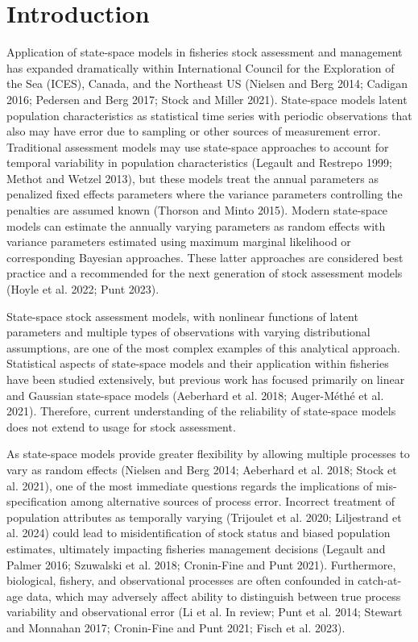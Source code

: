 \documentclass[
  12pt,
]{article}
\begin{document}
\pagebreak

\section*{Introduction}\label{introduction}

Application of state-space models in fisheries stock assessment and
management has expanded dramatically within International Council for
the Exploration of the Sea (ICES), Canada, and the Northeast US (Nielsen
and Berg 2014; Cadigan 2016; Pedersen and Berg 2017; Stock and Miller
2021). State-space models latent population characteristics as
statistical time series with periodic observations that also may have
error due to sampling or other sources of measurement error. Traditional
assessment models may use state-space approaches to account for temporal
variability in population characteristics (Legault and Restrepo 1999;
Methot and Wetzel 2013), but these models treat the annual parameters as
penalized fixed effects parameters where the variance parameters
controlling the penalties are assumed known (Thorson and Minto 2015).
Modern state-space models can estimate the annually varying parameters
as random effects with variance parameters estimated using maximum
marginal likelihood or corresponding Bayesian approaches. These latter
approaches are considered best practice and a recommended for the next
generation of stock assessment models (Hoyle et al. 2022; Punt 2023).

State-space stock assessment models, with nonlinear functions of latent
parameters and multiple types of observations with varying
distributional assumptions, are one of the most complex examples of this
analytical approach. Statistical aspects of state-space models and their
application within fisheries have been studied extensively, but previous
work has focused primarily on linear and Gaussian state-space models
(Aeberhard et al. 2018; {Auger-Méthé et al.} 2021). Therefore, current
understanding of the reliability of state-space models does not extend
to usage for stock assessment.

As state-space models provide greater flexibility by allowing multiple
processes to vary as random effects (Nielsen and Berg 2014; Aeberhard et
al. 2018; Stock et al. 2021), one of the most immediate questions
regards the implications of mis-specification among alternative sources
of process error. Incorrect treatment of population attributes as
temporally varying (Trijoulet et al. 2020; Liljestrand et al. 2024)
could lead to misidentification of stock status and biased population
estimates, ultimately impacting fisheries management decisions (Legault
and Palmer 2016; Szuwalski et al. 2018; Cronin-Fine and Punt 2021).
Furthermore, biological, fishery, and observational processes are often
confounded in catch-at-age data, which may adversely affect ability to
distinguish between true process variability and observational error (Li
et al. In review; Punt et al. 2014; Stewart and Monnahan 2017;
Cronin-Fine and Punt 2021; Fisch et al. 2023).
\end{document}
